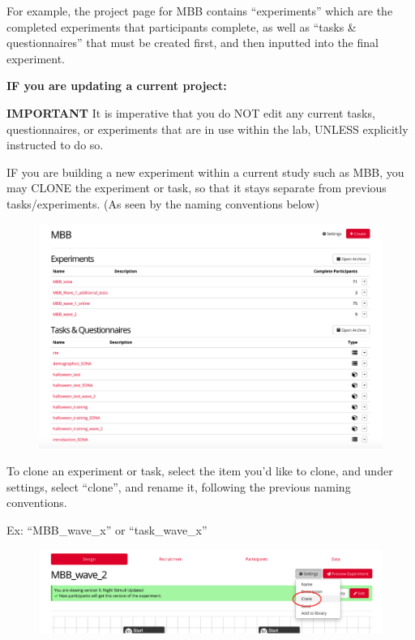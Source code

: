 \documentclass[]{book}
\begin{document}
For example, the project page for MBB contains ``experiments'' which are the completed experiments that participants complete, as well as ``tasks \& questionnaires'' that must be created first, and then inputted into the final experiment.

\textbf{IF you are updating a current project:}

\textbf{IMPORTANT} It is imperative that you do NOT edit any current tasks, questionnaires, or experiments that are in use within the lab, UNLESS explicitly instructed to do so.

IF you are building a new experiment within a current study such as MBB, you may CLONE the experiment or task, so that it stays separate from previous tasks/experiments. (As seen by the naming conventions below)

\begin{figure}
\centering
\includegraphics{images/research_protocols/gorilla/gorilla5.png}
\caption{}
\end{figure}

To clone an experiment or task, select the item you'd like to clone, and under settings, select ``clone'', and rename it, following the previous naming conventions.

Ex: ``MBB\_wave\_x'' or ``task\_wave\_x''

\begin{figure}
\centering
\includegraphics{images/research_protocols/gorilla/gorilla6.png}
\caption{}
\end{figure}
\end{document}
